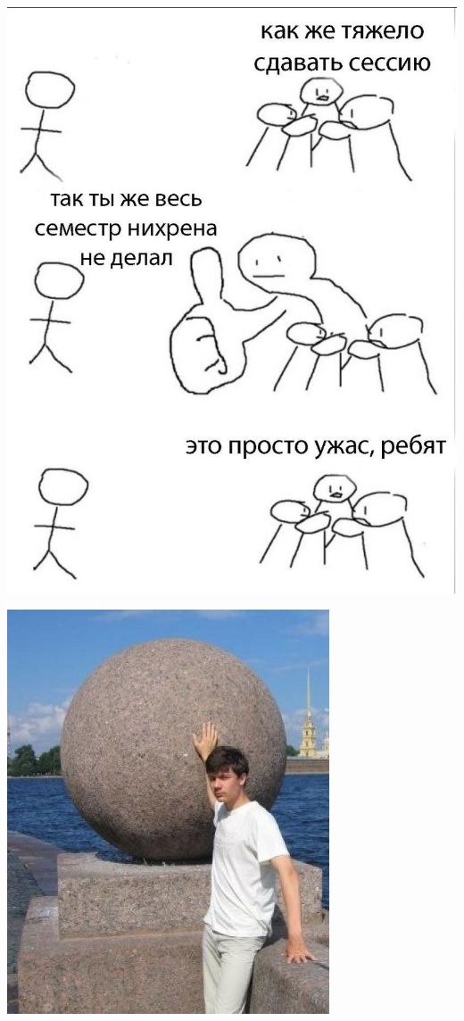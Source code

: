 \begin{titlepage}
\begin{minipage}{0.3\textwidth}
    \includegraphics[width=\textwidth]{images/mem1.png}
    \end{minipage}
    \begin{minipage}{0.365\textwidth}
    \includegraphics[width=\textwidth]{images/tulen111.jpg}

\end{minipage}
\end{titlepage}
